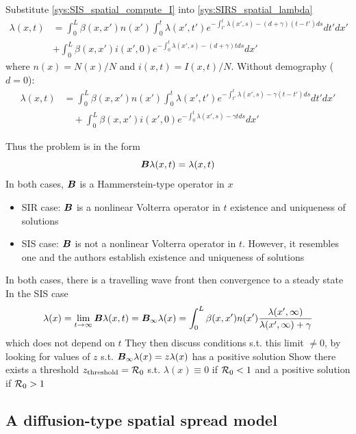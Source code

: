 \documentclass[aspectratio=169]{beamer}\usepackage[]{graphicx}\usepackage[]{xcolor}
\begin{document}
\begin{frame}
Substitute \eqref{sys:SIS_spatial_compute_I} into \eqref{sys:SIRS_spatial_lambda}
\[
\begin{aligned}
\lambda(x,t) &=
\int_0^L \beta(x,x')n(x')
\int_0^t \lambda(x',t')
e^{-\int_{t'}^t \lambda(x',s)-(d+\gamma)(t-t')ds}dt'dx' \\
&+\int_0^L \beta(x,x')i(x',0)
e^{-\int_0^t \lambda(x',s)-(d+\gamma)t ds}dx'
\end{aligned}
\]
where $n(x)=N(x)/N$ and $i(x,t)=I(x,t)/N$. Without demography ($d=0$):
\[
\begin{aligned}
\lambda(x,t) &=
\int_0^L \beta(x,x')n(x')
\int_0^t \lambda(x',t')
e^{-\int_{t'}^t \lambda(x',s)-\gamma(t-t')ds}dt'dx' \\
&\quad +\int_0^L \beta(x,x')i(x',0)
e^{-\int_0^t \lambda(x',s)-\gamma t ds}dx'
\end{aligned}
\]
\end{frame}


\begin{frame}
Thus the problem is in the form
\[
\bm{B}\lambda(x,t)=\lambda(x,t)
\]
\vfill
In both cases, $\bm{B}$ is a Hammerstein-type operator in $x$
\vfill
\begin{itemize}
\item SIR case: $\bm{B}$ is a nonlinear Volterra operator in $t$ \imply existence and uniqueness of solutions
\vfill
\item SIS case: $\bm{B}$ is not a nonlinear Volterra operator in $t$. However, it resembles one and the authors establish existence and uniqueness of solutions
\end{itemize}
\end{frame}


\begin{frame}
In both cases, there is a travelling wave front then convergence to a steady state
\vfill
In the SIS case
\[
\lambda(x)=\lim_{t\to\infty}\bm{B}\lambda(x,t)
=\bm{B}_\infty\lambda(x)=
\int_0^L\beta(x,x')n(x')
\frac{\lambda(x',\infty)}{\lambda(x',\infty)+\gamma}
\]
which does not depend on $t$
\vfill 
They then discuss conditions s.t. this limit $\neq 0$, by looking for values of $z$ s.t. $\bm{B}_\infty\lambda(x)=z\lambda(x)$ has a positive solution
\vfill
Show there exists a threshold $z_{\text{threshold}}=\mathcal{R}_0$ s.t. $\lambda(x)\equiv 0$ if $\mathcal{R}_0<1$ and a positive solution if $\mathcal{R}_0>1$
\end{frame}


\subsection{A diffusion-type spatial spread model}
\end{document}
